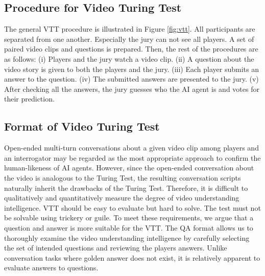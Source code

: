 \documentclass[letterpaper]{article} %
\begin{document}
\subsection{Procedure for Video Turing Test}
The general VTT procedure is illustrated in Figure \ref{fig:vtt}. All participants are separated from one another. Especially the jury can not see all players. A set of paired video clips and questions is prepared. Then, the rest of the procedures are as follows: (i) Players and the jury watch a video clip. (ii) A question about the video story is given to both the players and the jury. (iii) Each player submits an answer to the question. (iv) The submitted answers are presented to the jury. (v) After checking all the answers, the jury guesses who the AI agent is and votes for their prediction.

\subsection{Format of Video Turing Test}
Open-ended multi-turn conversations about a given video clip among players and an interrogator may be regarded as the most appropriate approach to confirm the human-likeness of AI agents. However, since the open-ended conversation about the video is analogous to the Turing Test, the resulting conversation scripts naturally inherit the drawbacks of the Turing Test. Therefore, it is difficult to qualitatively and quantitatively measure the degree of video understanding intelligence.
VTT should be easy to evaluate but hard to solve. The test must not be solvable using trickery or guile. To meet these requirements, we argue that a question and answer is more suitable for the VTT. The QA format allows us to thoroughly examine the video understanding intelligence by carefully selecting the set of intended questions and reviewing the players answers. Unlike conversation tasks where golden answer does not exist, it is relatively apparent to evaluate answers to questions.
\end{document}
